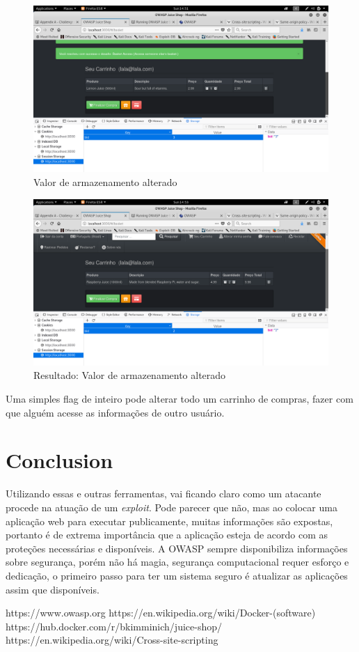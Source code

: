 \documentclass[journal]{IEEEtran}
\begin{document}
\begin{figure}[h!]
	\includegraphics[width=\linewidth]{../fotos/juice_shop/storage_value_changed.png}
	\caption{Valor de armazenamento alterado}
	\label{fig:storage_value_changed}
\end{figure}

\begin{figure}[h!]
	\includegraphics[width=\linewidth]{../fotos/juice_shop/storage_value_changed_2.png}
	\caption{Resultado: Valor de armazenamento alterado}
	\label{fig:storage_value_changed_2}
\end{figure}

Uma simples flag de inteiro pode alterar todo um carrinho de compras, fazer com que alguém acesse as informações de outro usuário.

\section{Conclusion}
Utilizando essas e outras ferramentas, vai ficando claro como um atacante procede na atuação de um \textit{exploit}. Pode parecer que não, mas ao colocar uma aplicação web para executar publicamente, muitas informações são expostas, portanto é de extrema importância que a aplicação esteja de acordo com as proteções necessárias e disponíveis. A OWASP sempre disponibiliza informações sobre segurança, porém não há magia, segurança computacional requer esforço e dedicação, o primeiro passo para ter um sistema seguro é atualizar as aplicações assim que disponíveis.



\begin{thebibliography}{1}

https://www.owasp.org
https://en.wikipedia.org/wiki/Docker-(software)
https://hub.docker.com/r/bkimminich/juice-shop/
https://en.wikipedia.org/wiki/Cross-site-scripting


\end{thebibliography}
\end{document}

